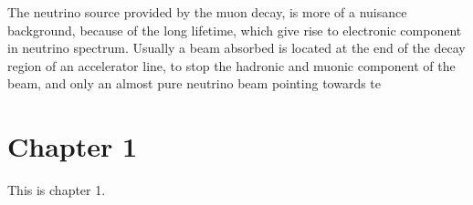 The neutrino source provided by the muon decay, is more of a nuisance background, because of the long lifetime, %
which give rise to electronic component in neutrino spectrum.
Usually a beam absorbed is located at the end of the decay region of an accelerator line, to stop the hadronic and %
muonic component of the beam, and only an almost pure neutrino beam pointing towards %
te
\chapter*{Chapter 1}

This is chapter 1.

\lorem
